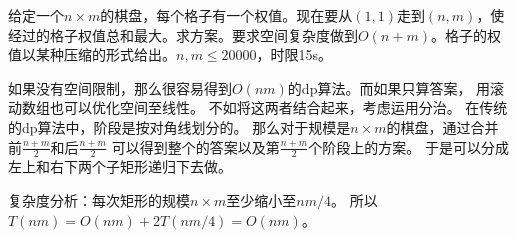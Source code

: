 \begin{prob}
	给定一个$n \times m$的棋盘，每个格子有一个权值。现在要从$(1,1)$走到$(n,m)$，使经过的格子权值总和最大。求方案。要求空间复杂度做到$O(n+m)$。格子的权值以某种压缩的形式给出。$n,m \le 20000$，时限15s。
\end{prob}

\begin{sol}
	如果没有空间限制，那么很容易得到$O(nm)$的dp算法。而如果只算答案，
	用滚动数组也可以优化空间至线性。
	不如将这两者结合起来，考虑运用分治。
	在传统的dp算法中，阶段是按对角线划分的。
	那么对于规模是$n \times m$的棋盘，通过合并前$\frac{n+m}{2}$和后$\frac{n+m}{2}$
	可以得到整个的答案以及第$\frac{n+m}{2}$个阶段上的方案。
	于是可以分成左上和右下两个子矩形递归下去做。\par
	复杂度分析：每次矩形的规模$n \times m$至少缩小至$nm/4$。
	所以$T(nm) = O(nm) + 2T(nm/4) = O(nm)$。
\end{sol}
